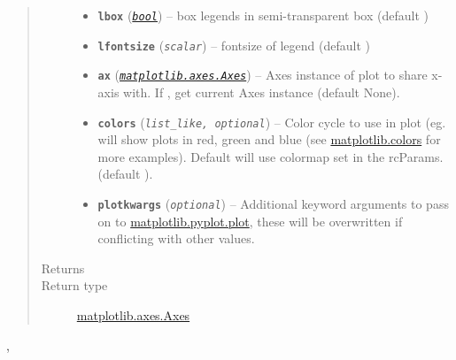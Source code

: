 \documentclass[letterpaper,10pt,english]{sphinxhowto}
\begin{document}
\begin{fulllineitems}
\begin{quote}
\begin{description}
\begin{itemize}
\item {} 
\textbf{\texttt{lbox}} (\href{https://docs.python.org/library/functions.html\#bool}{\emph{\texttt{bool}}}) -- box legends in semi-transparent box (default )

\item {} 
\textbf{\texttt{lfontsize}} (\emph{\texttt{scalar}}) -- fontsize of legend (default )

\item {} 
\textbf{\texttt{ax}} (\href{http://matplotlib.org/api/axes\_api.html\#matplotlib.axes.Axes}{\emph{\texttt{matplotlib.axes.Axes}}}) -- Axes instance of plot to share x-axis with. If , get
current Axes instance (default None).

\item {} 
\textbf{\texttt{colors}} (\emph{\texttt{list\_like, optional}}) -- 
Color cycle to use in plot (eg. \code{{[}'r','g','b'{]}} will show plots
in red, green and blue (see
\href{http://matplotlib.org/api/colors\_api.html}{matplotlib.colors}
for more examples). Default will use colormap set in the rcParams.
(default \code{{[}{]}}).


\item {} 
\textbf{\texttt{plotkwargs}} (\emph{\texttt{optional}}) -- Additional keyword arguments to pass on to
\href{http://matplotlib.org/api/pyplot\_api.html\#matplotlib.pyplot.plot}{matplotlib.pyplot.plot}, these will be overwritten if conflicting
with other values.

\end{itemize}

\item[{Returns}] \leavevmode


\item[{Return type}] \leavevmode
\href{http://matplotlib.org/api/axes\_api.html\#matplotlib.axes.Axes}{matplotlib.axes.Axes}

\end{description}\end{quote}




{\hyperref[swtools_doc:swtools.plot_basic]{\emph{}}}, {\hyperref[swtools_doc:swtools.plot_align]{\emph{}}}



\end{fulllineitems}
\end{document}
